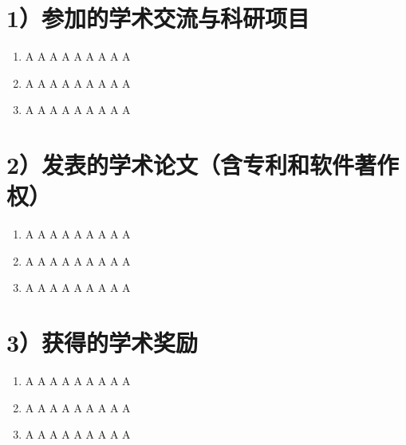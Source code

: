 
\begin{publications}

\section*{1）参加的学术交流与科研项目}

\begin{enumerate}[itemsep = 0pt, parsep = 0pt, label = (\arabic*)]
\item A A A A A A A A A
\item A A A A A A A A A
\item A A A A A A A A A
\end{enumerate}

\section*{2）发表的学术论文（含专利和软件著作权）}

\begin{enumerate}[itemsep = 0pt, parsep = 0pt, label = (\arabic*)]
\item A A A A A A A A A
\item A A A A A A A A A
\item A A A A A A A A A
\end{enumerate}

\section*{3）获得的学术奖励}
\begin{enumerate}[itemsep = 0pt, parsep = 0pt, label = (\arabic*)]
\item A A A A A A A A A
\item A A A A A A A A A
\item A A A A A A A A A
\end{enumerate}

\end{publications}
